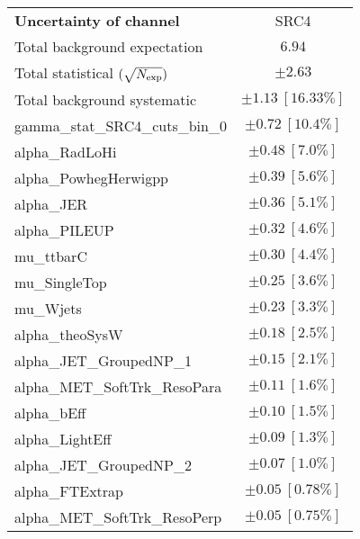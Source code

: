
\begin{table}
\begin{center}
\setlength{\tabcolsep}{0.0pc}
\begin{tabular*}{\textwidth}{@{\extracolsep{\fill}}lc}
\noalign{\smallskip}\hline\noalign{\smallskip}
{\bf Uncertainty of channel}                                    & SRC4            \\
\noalign{\smallskip}\hline\noalign{\smallskip}
Total background expectation             &  $6.94$       \\
\noalign{\smallskip}\hline\noalign{\smallskip}
Total statistical $(\sqrt{N_{\rm exp}})$              & $\pm 2.63$       \\
Total background systematic               & $\pm 1.13\ [16.33\%] $             \\
\noalign{\smallskip}\hline\noalign{\smallskip}
\noalign{\smallskip}\hline\noalign{\smallskip}
gamma\_stat\_SRC4\_cuts\_bin\_0         & $\pm 0.72\ [10.4\%] $       \\
alpha\_RadLoHi         & $\pm 0.48\ [7.0\%] $       \\
alpha\_PowhegHerwigpp         & $\pm 0.39\ [5.6\%] $       \\
alpha\_JER         & $\pm 0.36\ [5.1\%] $       \\
alpha\_PILEUP         & $\pm 0.32\ [4.6\%] $       \\
mu\_ttbarC         & $\pm 0.30\ [4.4\%] $       \\
mu\_SingleTop         & $\pm 0.25\ [3.6\%] $       \\
mu\_Wjets         & $\pm 0.23\ [3.3\%] $       \\
alpha\_theoSysW         & $\pm 0.18\ [2.5\%] $       \\
alpha\_JET\_GroupedNP\_1         & $\pm 0.15\ [2.1\%] $       \\
alpha\_MET\_SoftTrk\_ResoPara         & $\pm 0.11\ [1.6\%] $       \\
alpha\_bEff         & $\pm 0.10\ [1.5\%] $       \\
alpha\_LightEff         & $\pm 0.09\ [1.3\%] $       \\
alpha\_JET\_GroupedNP\_2         & $\pm 0.07\ [1.0\%] $       \\
alpha\_FTExtrap         & $\pm 0.05\ [0.78\%] $       \\
alpha\_MET\_SoftTrk\_ResoPerp         & $\pm 0.05\ [0.75\%] $       \\

\end{tabular*}
\end{center}
\end{table}
